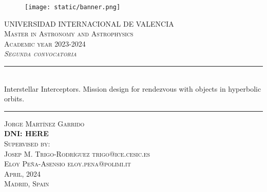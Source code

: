 \begin{titlepage}

  \begin{center}

    \begin{figure}[h]
      \centering
      \texttt{[image: static/banner.png]}
    \end{figure}
    \vspace{1cm}

    \textsc{\large
      UNIVERSIDAD INTERNACIONAL DE VALENCIA
    }\\[0.25cm]
    \textsc{\large
      Master in Astronomy and Astrophysics \\
      Academic year 2023-2024
    }\\[1cm]
    \textsc{\large
    \textit{Segunda convocatoria}
    }\\[1.25cm]

    \noindent\rule{\textwidth}{1pt}
    \\[0.25cm]
    {
    \fontsize{35pt}{35pt}\selectfont
    {
      Interstellar Interceptors. Mission design for rendezvous with objects in hyperbolic orbits.
    }
    }
    \noindent\rule{\textwidth}{1pt}

    \vspace{1.5cm}
    \textsc{\Large
      Jorge Martínez Garrido \\
      \textbf{DNI: HERE}
    }\\[1.25cm]
    \textsc{\large
      Supervised by:
    }\\[0.25cm]
    \textsc{\large
     Josep M. Trigo-Rodríguez trigo@ice.cesic.es \\
     Eloy Peña-Asensio eloy.pena@polimi.it
    }\\[1.5cm]

    \textsc{\large
       April, 2024
    }\\[0.25cm]
    \textsc{\large
       Madrid, Spain
    }\\[0.25cm]

  \end{center}
\end{titlepage}
